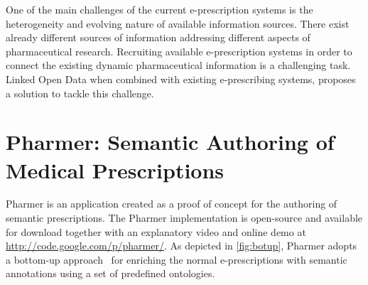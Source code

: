 \documentclass[conference]{IEEEtran}
\begin{document}


One of the main challenges of the current e-prescription systems is the heterogeneity and evolving nature of available information sources.
There exist already different sources of information addressing different aspects of pharmaceutical research.
Recruiting available e-prescription systems in order to connect the existing dynamic pharmaceutical information is a challenging task.
Linked Open Data when combined with existing e-prescribing systems, proposes a solution to tackle this challenge.

\section{Pharmer: Semantic Authoring of Medical Prescriptions}
\label{sec:pharmer}
Pharmer is an application created as a proof of concept for the authoring of semantic prescriptions.
The Pharmer implementation is open-source and available for download together with an explanatory video and online demo at \url{http://code.google.com/p/pharmer/}.
As depicted in \autoref{fig:botup}, Pharmer adopts a bottom-up approach~\cite{khalili2012} for enriching the normal e-prescriptions with semantic annotations using a set of predefined ontologies.
\end{document}
